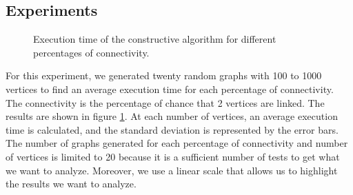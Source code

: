 
\subsection{Experiments}

\begin{figure}[H]
    \centering
    \caption{Execution time of the constructive algorithm for different percentages of connectivity.}
    \label{fig:constructive_time}
\end{figure}

For this experiment, we generated twenty random graphs with 100 to 1000 vertices to find an average execution time for each percentage of connectivity. The connectivity is the percentage of chance that 2 vertices are linked. The results are shown in figure \ref{fig:constructive_time}. At each number of vertices, an average execution time is calculated, and the standard deviation is represented by the error bars. The number of graphs generated for each percentage of connectivity and number of vertices is limited to 20 because it is a sufficient number of tests to get what we want to analyze. Moreover, we use a linear scale that allows us to highlight the results we want to analyze.